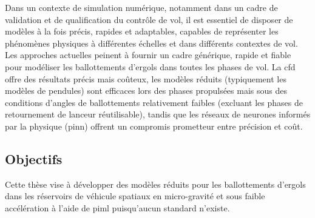 \documentclass[12pt]{article}
\begin{document}
	Dans un contexte de simulation numérique, notamment dans un cadre de validation et de qualification du contrôle de vol, il est essentiel de disposer de modèles à la fois précis, rapides et adaptables, capables de représenter les phénomènes physiques à différentes échelles et dans différents contextes de vol.
	Les approches actuelles peinent à fournir un cadre générique, rapide et fiable pour modéliser les ballottements d’ergols dans toutes les phases de vol. La \acrshort{cfd} offre des résultats précis mais coûteux, les modèles réduits (typiquement les modèles de pendules) sont efficaces lors des phases propulsées mais sous des conditions d'angles de ballottements relativement faibles (excluant les phases de retournement de lanceur réutilisable), tandis que les réseaux de neurones informés par la physique (\gls{pinn}) offrent un compromis prometteur entre précision et coût.
	
	\subsection*{Objectifs}
	
	Cette thèse vise à développer des modèles réduits pour les ballottements d'ergols dans les réservoirs de véhicule spatiaux en micro-gravité et sous faible accélération à l'aide de \acrfull{piml} puisqu'aucun standard n'existe.
	
\end{document}
